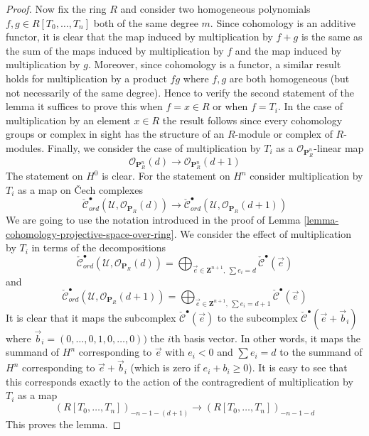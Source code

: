 \documentclass{stacks-project}
\theoremstyle{plain}
\theoremstyle{definition}
\theoremstyle{remark}
\numberwithin{equation}{subsection}
\begin{document}
\begin{proof}
\medskip\noindent
Now fix the ring $R$ and consider two homogeneous polynomials
$f, g \in R[T_0, \ldots, T_n]$ both of the same degree $m$.
Since cohomology is an additive functor, it is clear that the
map induced by multiplication by $f + g$ is the same as the sum
of the maps induced by multiplication by $f$ and the map induced
by multiplication by $g$. Moreover, since cohomology is a functor,
a similar result holds for multiplication by a product $fg$ where
$f, g$ are both homogeneous (but not necessarily of the same degree).
Hence to verify the second statement of the lemma it suffices to
prove this when $f = x \in R$ or when $f = T_i$.
In the case of multiplication by an element $x \in R$ the result
follows since every cohomology groups or complex in sight has the
structure of an $R$-module or complex of $R$-modules.
Finally, we consider the case of multiplication by $T_i$
as a $\mathcal{O}_{\mathbf{P}^n_R}$-linear map
$$
\mathcal{O}_{\mathbf{P}^n_R}(d)
\longrightarrow
\mathcal{O}_{\mathbf{P}^n_R}(d + 1)
$$
The statement on $H^0$ is clear. For the statement on $H^n$
consider multiplication by $T_i$ as a map on {\v C}ech complexes
$$
\check{\mathcal{C}}_{ord}^\bullet(\mathcal{U},
\mathcal{O}_{\mathbf{P}_R}(d))
\longrightarrow
\check{\mathcal{C}}_{ord}^\bullet(\mathcal{U},
\mathcal{O}_{\mathbf{P}_R}(d + 1))
$$
We are going to use the notation introduced in the proof of
Lemma \ref{lemma-cohomology-projective-space-over-ring}.
We consider the effect of multiplication by $T_i$
in terms of the decompositions
$$
\check{\mathcal{C}}_{ord}^\bullet(\mathcal{U}, \mathcal{O}_{\mathbf{P}_R}(d))
=
\bigoplus\nolimits_{\vec{e} \in \mathbf{Z}^{n + 1}, \ \sum e_i = d}
\check{\mathcal{C}}^\bullet(\vec{e})
$$
and
$$
\check{\mathcal{C}}_{ord}^\bullet(\mathcal{U},
\mathcal{O}_{\mathbf{P}_R}(d + 1))
=
\bigoplus\nolimits_{\vec{e} \in \mathbf{Z}^{n + 1}, \ \sum e_i = d + 1}
\check{\mathcal{C}}^\bullet(\vec{e})
$$
It is clear that it maps the subcomplex
$\check{\mathcal{C}}^\bullet(\vec{e})$ to the subcomplex
$\check{\mathcal{C}}^\bullet(\vec{e} + \vec{b}_i)$ where
$\vec{b}_i = (0, \ldots, 0, 1, 0, \ldots, 0))$ the $i$th basis vector.
In other words, it maps the summand of $H^n$ corresponding to
$\vec{e}$ with $e_i < 0$ and $\sum e_i = d$
to the summand of $H^n$ corresponding to
$\vec{e} + \vec{b}_i$ (which is zero if $e_i + b_i \geq 0$).
It is easy to see that this corresponds exactly to the action
of the contragredient of multiplication by $T_i$ as a map
$$
(R[T_0, \ldots, T_n])_{-n - 1 - (d + 1)}
\longrightarrow
(R[T_0, \ldots, T_n])_{-n - 1 - d}
$$
This proves the lemma.
\end{proof}
\end{document}
